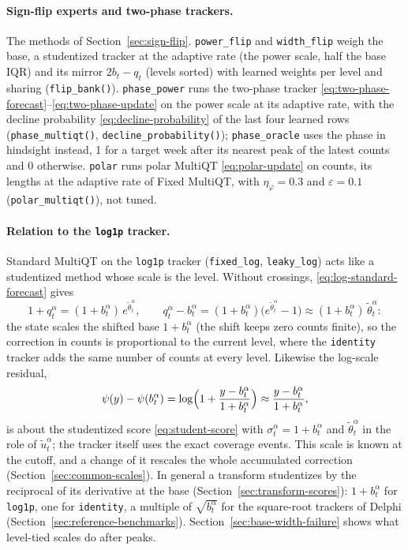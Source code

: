\documentclass[11pt,a4paper]{article}
\theoremstyle{definition}
\theoremstyle{remark}
\begin{document}
\paragraph{Sign-flip experts and two-phase trackers.}
\label{sec:two-phase-methods}
The methods of Section~\ref{sec:sign-flip}. \texttt{power\_flip} and
\texttt{width\_flip} weigh the base, a studentized tracker at the adaptive
rate (the power scale, half the base IQR) and its mirror $2b_t-q_t$ (levels sorted) with learned weights per
level and sharing (\texttt{flip\_bank()}). \texttt{phase\_power} runs the
two-phase tracker \eqref{eq:two-phase-forecast}--\eqref{eq:two-phase-update}
on the power scale at its adaptive rate, with the decline probability
\eqref{eq:decline-probability} of the last four learned rows
(\texttt{phase\_multiqt()}, \texttt{decline\_probability()});
\texttt{phase\_oracle} uses the phase in hindsight instead, 1 for a target
week after its nearest peak of the latest counts and 0 otherwise.
\texttt{polar} runs polar MultiQT \eqref{eq:polar-update} on counts, its
lengths at the adaptive rate of Fixed MultiQT, with $\eta_\varphi=0.3$ and
$\varepsilon=0.1$ (\texttt{polar\_multiqt()}), not tuned.

\paragraph{Relation to the \texttt{log1p} tracker.}
\label{sec:log-tracker-scale}
Standard MultiQT on the \texttt{log1p} tracker (\texttt{fixed\_log},
\texttt{leaky\_log}) acts like a studentized method whose scale is the
level. Without crossings, \eqref{eq:log-standard-forecast} gives
\begin{equation}
 1+q_t^\alpha=(1+b_t^\alpha)\,e^{\tilde\theta_t^\alpha},\qquad
 q_t^\alpha-b_t^\alpha=(1+b_t^\alpha)\bigl(e^{\tilde\theta_t^\alpha}-1\bigr)
 \approx(1+b_t^\alpha)\,\tilde\theta_t^\alpha :
 \label{eq:log-tracker-multiplicative}
\end{equation}
the state scales the shifted base $1+b_t^\alpha$ (the shift keeps zero
counts finite), so the correction in counts is proportional to the current
level, where the \texttt{identity} tracker adds the same number of counts at
every level. Likewise the log-scale residual,
\begin{equation}
 \psi(y)-\psi(b_t^\alpha)
 =\log\Bigl(1+\frac{y-b_t^\alpha}{1+b_t^\alpha}\Bigr)
 \approx\frac{y-b_t^\alpha}{1+b_t^\alpha},
 \label{eq:log-tracker-scale}
\end{equation}
is about the studentized score \eqref{eq:student-score} with
$\sigma_t^\alpha=1+b_t^\alpha$ and $\tilde\theta_t^\alpha$ in the role of
$\tilde u_t^\alpha$; the tracker itself uses the exact coverage events. This
scale is known at the cutoff, and a change of it rescales the whole
accumulated correction (Section~\ref{sec:common-scales}). In general a
transform studentizes by the reciprocal of its derivative at the base
(Section~\ref{sec:transform-scores}): $1+b_t^\alpha$ for \texttt{log1p}, one
for \texttt{identity}, a multiple of $\sqrt{b_t^\alpha}$ for the square-root
trackers of Delphi (Section~\ref{sec:reference-benchmarks}).
Section~\ref{sec:base-width-failure} shows what level-tied scales do after
peaks.
\end{document}
